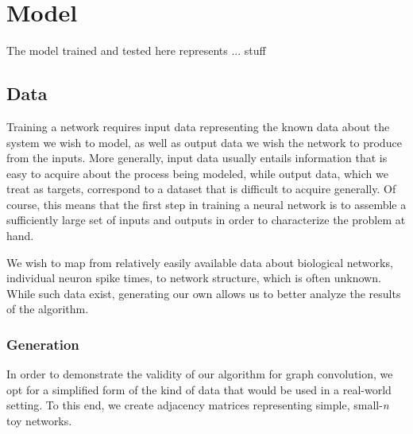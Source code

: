 \graphicspath{ {resources/} }
\chapter{Model}
\label{model}
The model trained and tested here represents ... stuff

\section{Data}
\label{sec:data}
Training a network requires input data representing the known data about the 
system we
wish to model, as well as output data we wish the network to produce from the
inputs. More generally, input data usually entails information that is easy to 
acquire about the process being modeled, while output data, which we treat as 
targets,
correspond to a dataset that is difficult to acquire generally. Of course, this 
means that the first step in training a neural network is to assemble a 
sufficiently large set of inputs and outputs in order to characterize the 
problem at hand.

We wish to map from relatively easily available data about biological networks, 
individual neuron spike times, to network structure, which is often unknown.  
While such data exist, generating our own allows us to better analyze the 
results of the algorithm.


\subsection{Generation}
\label{subsec:generation}
In order to demonstrate the validity of our algorithm for graph convolution, we 
opt for a simplified form of the kind of data that would be used in a real-world 
setting.  To this end, we create adjacency matrices representing simple, 
small-\textit{n} toy networks.

